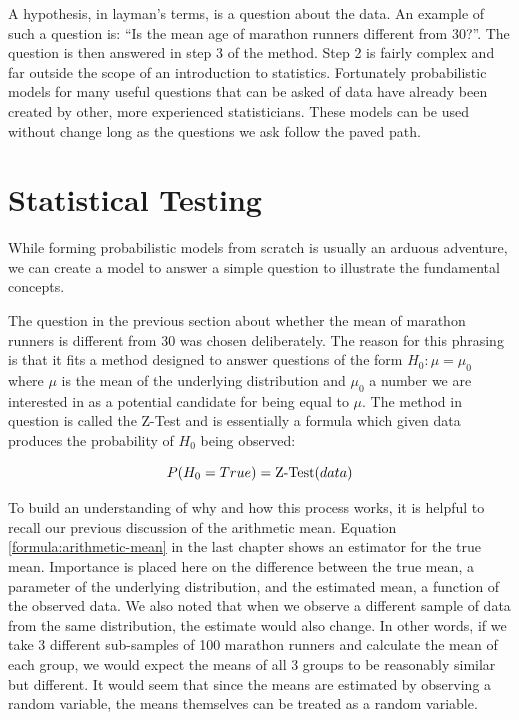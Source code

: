 \documentclass{tufte-book} %
\begin{document}
A hypothesis, in layman's terms, is a question about the data. An example of such a question is: ``Is the mean age of marathon runners different from 30?''. The question is then answered in step 3 of the method. Step 2 is fairly complex and far outside the scope of an introduction to statistics. Fortunately probabilistic models for many useful questions that can be asked of data have already been created by other, more experienced statisticians. These models can be used without change long as the questions we ask follow the paved path.

\section{Statistical Testing}
While forming probabilistic models from scratch is usually an arduous adventure, we can create a model to answer a simple question to illustrate the fundamental concepts.

The question in the previous section about whether the mean of marathon runners is different from 30 was chosen deliberately. The reason for this phrasing is that it fits a method designed to answer questions of the form $H_0: \mu = \mu_0$ where $\mu$ is the mean of the underlying distribution and $\mu_0$ a number we are interested in as a potential candidate for being equal to $\mu$. The method in question is called the \hbox{Z-Test} and is essentially a formula which given data produces the probability of $H_0$ being observed:

\begin{equation}
P(H_0 = True) = \hbox{Z-Test}(data)
\end{equation}

To build an understanding of why and how this process works, it is helpful to recall our previous discussion of the arithmetic mean. Equation \ref{formula:arithmetic-mean} in the last chapter shows an estimator for the true mean. Importance is placed here on the difference between the true mean, a parameter of the underlying distribution, and the estimated mean, a function of the observed data. We also noted that when we observe a different sample of data from the same distribution, the estimate would also change. In other words, if we take 3 different sub-samples of 100 marathon runners and calculate the mean of each group, we would expect the means of all 3 groups to be reasonably similar but different. It would seem that since the means are estimated by observing a random variable, the means themselves can be treated as a random variable. 
\end{document}
